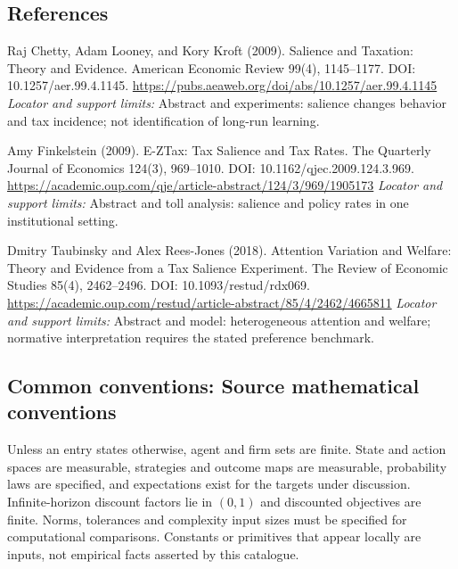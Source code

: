 \documentclass[11pt,a4paper]{article}
\begin{document}
\subsection*{References}
\begin{enumerate}[label={[S\arabic*]},leftmargin=*,itemsep=0.6em]
\item Raj Chetty, Adam Looney, and Kory Kroft (2009). Salience and Taxation: Theory and Evidence. American Economic Review 99(4), 1145--1177. DOI: 10.1257/aer.99.4.1145.
\url{https://pubs.aeaweb.org/doi/abs/10.1257/aer.99.4.1145}
\newline\emph{Locator and support limits:} Abstract and experiments: salience changes behavior and tax incidence; not identification of long-run learning.
\item Amy Finkelstein (2009). E-ZTax: Tax Salience and Tax Rates. The Quarterly Journal of Economics 124(3), 969--1010. DOI: 10.1162/qjec.2009.124.3.969.
\url{https://academic.oup.com/qje/article-abstract/124/3/969/1905173}
\newline\emph{Locator and support limits:} Abstract and toll analysis: salience and policy rates in one institutional setting.
\item Dmitry Taubinsky and Alex Rees-Jones (2018). Attention Variation and Welfare: Theory and Evidence from a Tax Salience Experiment. The Review of Economic Studies 85(4), 2462--2496. DOI: 10.1093/restud/rdx069.
\url{https://academic.oup.com/restud/article-abstract/85/4/2462/4665811}
\newline\emph{Locator and support limits:} Abstract and model: heterogeneous attention and welfare; normative interpretation requires the stated preference benchmark.
\end{enumerate}

\subsection*{Common conventions: Source mathematical conventions}

Unless an entry states otherwise, agent and firm sets are finite. State and action spaces are measurable, strategies and outcome maps are measurable, probability laws are specified, and expectations exist for the targets under discussion. Infinite-horizon discount factors lie in $(0,1)$ and discounted objectives are finite. Norms, tolerances and complexity input sizes must be specified for computational comparisons. Constants or primitives that appear locally are inputs, not empirical facts asserted by this catalogue.
\end{document}
